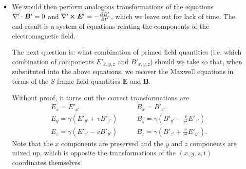 \documentclass[11pt, a4paper]{article}
\renewcommand{\vec}[1]{\bm{#1}} %
\newcommand{\E}{\vec{E}} %
\newcommand{\B}{\vec{B}} %
\newcommand{\divp}{\nabla' \mspace{-1mu} \cdot}  %
\newcommand{\curlp}{\nabla' \mspace{-2mu} \cross}
\begin{document}
\begin{itemize}
    \item We would then perform analogous transformations of the equations $ \divp \B' = 0 $ and $ \curlp \E' = - \pdv{B'}{t'} $, which we leave out for lack of time. The end result is a system of equations relating the components of the electromagnetic field.
    
    The next question is: what combination of primed field quantities (i.e. which combination of components $ E'_{x,y,z} $ and $ B'_{x,y,z} $) should we take so that, when substituted into the above equations, we recover the Maxwell equations in terms of the $ S $ frame field quantities $ \E $ and $ \B $.
	
	Without proof, it turns out the correct transformations are 
    \begin{equation*}
        \begin{array}{ll}
            E_{x} = E'_{x'} & \qquad B_{x} = B'_{x'}\\
            E_{y} = \gamma (E'_{y'} + v B'_{z'}) & \qquad B_{y} = \gamma \left (B'_{y'} - \frac{v}{c^{2}} E'_{z'}\right)\\
            E_{z} = \gamma (E'_{z'} - vB'_{y'}) & \qquad B_{z} = \gamma \left (B'_{z'} + \frac{v}{c^{2}} E'_{y'}\right ).
        \end{array}
    \end{equation*}
   	Note that the $ x $	components are preserved and the $ y $ and $ z $ components are mixed up, which is opposite the transformations of the $ (x, y, z, t) $ coordinates themselves.
\end{itemize}
\end{document}
